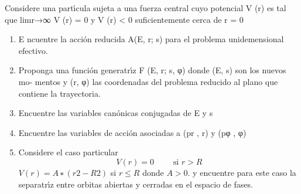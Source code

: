 \documentclass[10pt,oneside]{CBFT_book}
\begin{document}
\begin{ejercicios}
\label{ej36}
\item{ \bf }
Considere una partı́cula sujeta a una fuerza central cuyo potencial V (r) es tal que
limr→∞ V (r) = 0 y V (r) < 0 suficientemente cerca de r = 0
\begin{enumerate}[label=(\alph*)]
\item E ncuentre la acción reducida A(E, r; s) para el problema unidemensional efectivo.
\item Proponga una función generatrı́z F (E, r; s, φ) donde (E, s) son los nuevos mo-
mentos y (r, φ) las coordenadas del problema reducido al plano que contiene la
trayectoria.
\item Encuentre las variables canónicas conjugadas de E y s
\item Encuentre las variables de acción asociadas a (pr , r) y (pφ , φ)
\item Considere el caso particular
\[
	V(r) = 0 \qquad \text{ si } r > R
\]
$V (r) = A ∗ (r2 − R2 )$ si $r ≤ R$ donde $A > 0$. y encuentre para este caso la separatrı́z
entre orbitas abiertas y cerradas en el espacio de fases.
\end{enumerate}


\end{ejercicios}
\end{document}
